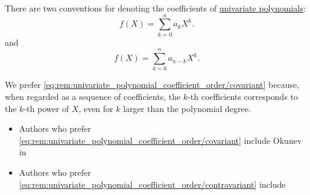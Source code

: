 \begin{remark}\label{rem:univariate_polynomial_coefficient_order}
  There are two conventions for denoting the coefficients of \hyperref[def:univariate_polynomial]{univariate polynomials}:
  \begin{equation}\label{eq:rem:univariate_polynomial_coefficient_order/covariant}
    f(X) = \sum_{k=0}^n a_k X^k.
  \end{equation}
  and
  \begin{equation}\label{eq:rem:univariate_polynomial_coefficient_order/contravariant}
    f(X) = \sum_{k=0}^n a_{n-k} X^k.
  \end{equation}

  We prefer \eqref{eq:rem:univariate_polynomial_coefficient_order/covariant} because, when regarded as a sequence of coefficients, the \( k \)-th coefficients corresponds to the \( k \)-th power of \( X \), even for \( k \) larger than the polynomial degree.

  \begin{itemize}
    \item Authors who prefer \eqref{eq:rem:univariate_polynomial_coefficient_order/covariant} include
    Okunev in \cite[132]{АлександровМаркушевичХинчинИПр1951ЭнциклопедияТом2}

    \item Authors who prefer \eqref{eq:rem:univariate_polynomial_coefficient_order/contravariant} include
  \end{itemize}
\end{remark}

